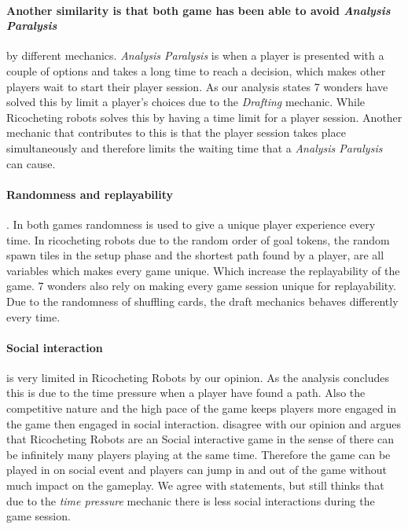 \documentclass[a4paper]{article}
\begin{document}
  \paragraph{Another similarity is that both game has been able to avoid \textit{Analysis Paralysis}} by different mechanics. \textit{Analysis Paralysis} is when a player is presented with a couple of options and takes a long time to reach a decision, which makes other players wait to start their player session. As our analysis states 7 wonders have solved this by limit a player's choices due to the \textit{Drafting} mechanic. While Ricocheting robots solves this by having a time limit for a player session. Another mechanic that contributes to this is that the player session takes place simultaneously and therefore limits the waiting time that a \textit{Analysis Paralysis} can cause.

  \paragraph{Randomness and replayability}. In both games randomness is used to give a unique player experience every time. In ricocheting robots due to the random order of goal tokens, the random spawn tiles in the setup phase and the shortest path found by a player, are all variables which makes every game unique. Which increase the replayability of the game. 7 wonders also rely on making every game session unique for replayability. Due to the randomness of shuffling cards, the draft mechanics behaves differently every time.

  \paragraph{Social interaction} is very limited in Ricocheting Robots by our opinion. As the analysis concludes this is due to the time pressure when a player have found a path. Also the competitive nature and the high pace of the game keeps players more engaged in the game then engaged in social interaction.  disagree with our opinion and argues that Ricocheting Robots are an Social interactive game in the sense of there can be infinitely many players playing at the same time. Therefore the game can be played in on  social event and players can jump in and out of the game without much impact on the gameplay. We agree with \citeauthor{danbeckRR} statements, but still thinks that due to the \textit{time pressure} mechanic there is less social interactions during the game session.
\end{document}
